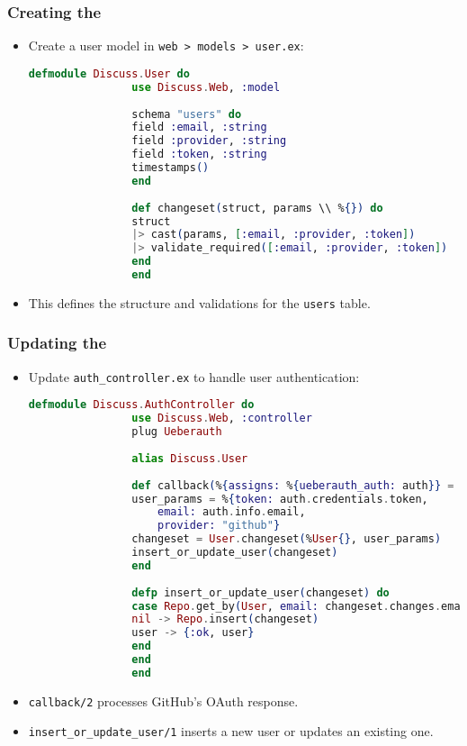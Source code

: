\documentclass[aspectratio=169, table]{beamer}
\begin{document}
	\begin{frame}[fragile]
		\frametitle{Creating the }
		\begin{itemize}
			\item Create a user model in \texttt{web > models > user.ex}:
			\begin{lstlisting}[language=Elixir]
				defmodule Discuss.User do
				use Discuss.Web, :model
				
				schema "users" do
				field :email, :string
				field :provider, :string
				field :token, :string
				timestamps()
				end
				
				def changeset(struct, params \\ %{}) do
				struct
				|> cast(params, [:email, :provider, :token])
				|> validate_required([:email, :provider, :token])
				end
				end
			\end{lstlisting}
			\item This defines the structure and validations for the \texttt{users} table.
		\end{itemize}
	\end{frame}
	
	\begin{frame}[fragile]
		\frametitle{Updating the }
		\begin{itemize}
			\item Update \texttt{auth\_controller.ex} to handle user authentication:
			\begin{lstlisting}[language=Elixir]
				defmodule Discuss.AuthController do
				use Discuss.Web, :controller
				plug Ueberauth
				
				alias Discuss.User
				
				def callback(%{assigns: %{ueberauth_auth: auth}} = conn, _params) do
				user_params = %{token: auth.credentials.token,
					email: auth.info.email,
					provider: "github"}
				changeset = User.changeset(%User{}, user_params)
				insert_or_update_user(changeset)
				end
				
				defp insert_or_update_user(changeset) do
				case Repo.get_by(User, email: changeset.changes.email) do
				nil -> Repo.insert(changeset)
				user -> {:ok, user}
				end
				end
				end
			\end{lstlisting}
			\item \texttt{callback/2} processes GitHub's OAuth response.
			\item \texttt{insert\_or\_update\_user/1} inserts a new user or updates an existing one.
		\end{itemize}
	\end{frame}
	
\end{document}
